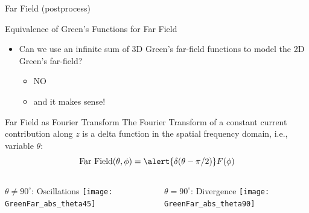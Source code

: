 \begin{frame}[allowframebreaks]{Far Field (postprocess)}

  \begin{block}{Equivalence of Green's Functions for Far Field}
    \begin{itemize}
    \item Can we use an infinite sum of 3D Green's far-field functions
      to model the 2D Green's far-field?
      \begin{itemize}
      \item \alert {NO}
      \item and it makes sense!
      \end{itemize}
    \end{itemize}
  \end{block}
    

  \begin{block}{Far Field as Fourier Transform} 
      The Fourier Transform of a constant current contribution along
      $z$ is a delta function in the spatial frequency domain, i.e.,
      variable $\theta$:
      \begin{equation}
        \text{Far Field}(\theta,\phi) =  \alert{\delta(\theta-\pi/2)}  F(\phi)
      \end{equation}
      
    \end{block}
  
    \framebreak %

    \begin{columns}
       \centering
      \begin{block}{$\theta\ne 90^\circ$: \alert{Oscillations}}
        \texttt{[image: GreenFar\_abs\_theta45]} \\
      \end{block}
      
       \centering
      \begin{block}{$\theta=90^\circ$: \alert{Divergence}}
        \texttt{[image: GreenFar\_abs\_theta90]} \\
      \end{block}
            
    \end{columns}

  \end{frame}
  

